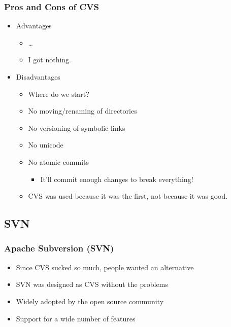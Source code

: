 \documentclass{beamer}
\begin{document}
\begin{frame}
    \frametitle{Pros and Cons of CVS}
    \begin{itemize}
	\item Advantages
	\begin{itemize}
	    \item \ldots
	    \item I got nothing.
	\end{itemize}
    \item Disadvantages
	\begin{itemize}
	    \item Where do we start?
	    \item No moving/renaming of directories
	    \item No versioning of symbolic links
	    \item No unicode
	    \item No atomic commits 
	    \begin{itemize}
		\item It'll commit enough changes to break everything!
	    \end{itemize}
	    \item CVS was used because it was the first, not because it was good.
	\end{itemize}
    \end{itemize}
\end{frame}

\subsection{SVN}

\begin{frame}
    \frametitle{Apache Subversion (SVN)}
    \begin{itemize}
	\item Since CVS sucked so much, people wanted an alternative
	\item SVN was designed as CVS without the problems
	\item Widely adopted by the open source community
	\item Support for a wide number of features
    \end{itemize}
\end{frame}
\end{document}
